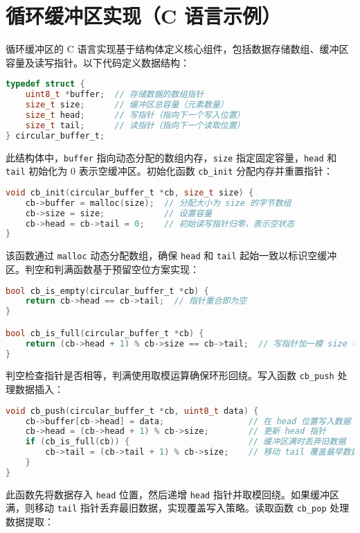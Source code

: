 \chapter{循环缓冲区实现（C 语言示例）}
循环缓冲区的 C 语言实现基于结构体定义核心组件，包括数据存储数组、缓冲区容量及读写指针。以下代码定义数据结构：\par
\begin{lstlisting}[language=c]
typedef struct {
    uint8_t *buffer;  // 存储数据的数组指针
    size_t size;      // 缓冲区总容量（元素数量）
    size_t head;      // 写指针（指向下一个写入位置）
    size_t tail;      // 读指针（指向下一个读取位置）
} circular_buffer_t;
\end{lstlisting}
此结构体中，\texttt{buffer} 指向动态分配的数组内存，\texttt{size} 指定固定容量，\texttt{head} 和 \texttt{tail} 初始化为 0 表示空缓冲区。初始化函数 \texttt{cb\_{}init} 分配内存并重置指针：\par
\begin{lstlisting}[language=c]
void cb_init(circular_buffer_t *cb, size_t size) {
    cb->buffer = malloc(size);  // 分配大小为 size 的字节数组
    cb->size = size;            // 设置容量
    cb->head = cb->tail = 0;    // 初始读写指针归零，表示空状态
}
\end{lstlisting}
该函数通过 \texttt{malloc} 动态分配数组，确保 \texttt{head} 和 \texttt{tail} 起始一致以标识空缓冲区。判空和判满函数基于预留空位方案实现：\par
\begin{lstlisting}[language=c]
bool cb_is_empty(circular_buffer_t *cb) {
    return cb->head == cb->tail;  // 指针重合即为空
}

bool cb_is_full(circular_buffer_t *cb) {
    return (cb->head + 1) % cb->size == cb->tail;  // 写指针加一模 size 等于读指针即为满
}
\end{lstlisting}
判空检查指针是否相等，判满使用取模运算确保环形回绕。写入函数 \texttt{cb\_{}push} 处理数据插入：\par
\begin{lstlisting}[language=c]
void cb_push(circular_buffer_t *cb, uint8_t data) {
    cb->buffer[cb->head] = data;                 // 在 head 位置写入数据
    cb->head = (cb->head + 1) % cb->size;        // 更新 head 指针
    if (cb_is_full(cb)) {                        // 缓冲区满时丢弃旧数据
        cb->tail = (cb->tail + 1) % cb->size;    // 移动 tail 覆盖最早数据
    }
}
\end{lstlisting}
此函数先将数据存入 \texttt{head} 位置，然后递增 \texttt{head} 指针并取模回绕。如果缓冲区满，则移动 \texttt{tail} 指针丢弃最旧数据，实现覆盖写入策略。读取函数 \texttt{cb\_{}pop} 处理数据提取：\par

